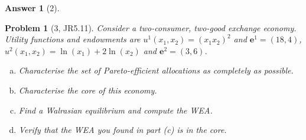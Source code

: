 \documentclass{article}
\newtheorem*{ans}{Answer}
\newtheorem*{prob}{{\bf Problem}}
\newcommand{\1}{{\bf 1}}
\newcommand{\0}{{\mathbf{0}}}
\newcommand{\e}{{\mathbf{e}}}
\newcommand{\<}{\langle}
\renewcommand{\>}{\rangle}
\begin{document}
\begin{ans}[2]
\begin{enumerate}[(a)]
\end{enumerate}	
\end{ans}

\begin{prob}[3, JR5.11] Consider a two-consumer, two-good exchange economy. Utility functions and endowments are $u^1(x_1, x_2) = (x_1x_2)^2$ and $\e^1 = (18, 4)$,
$	u^2(x_1, x_2) = \ln(x_1) + 2 \ln(x_2)$ and $\e^2 = (3, 6)$.
\begin{enumerate}[(a)]
	\item  Characterise the set of Pareto-efficient allocations as completely as possible. 
	\item  Characterise the core of this economy.
\item Find a Walrasian equilibrium and compute the WEA.
\item Verify that the WEA you found in part (c) is in the core.
	\end{enumerate}
\end{prob}
\end{document}
